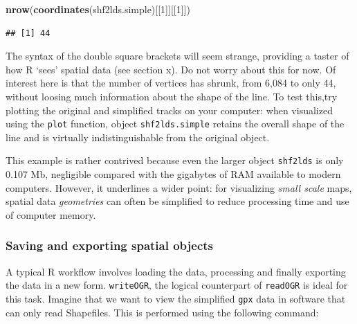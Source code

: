 \documentclass[]{article}
\newenvironment{Shaded}{}{}
\newcommand{\KeywordTok}[1]{\textcolor[rgb]{0.00,0.44,0.13}{\textbf{{#1}}}}
\newcommand{\DecValTok}[1]{\textcolor[rgb]{0.25,0.63,0.44}{{#1}}}
\newcommand{\NormalTok}[1]{{#1}}
\begin{document}
\begin{Shaded}
\begin{Highlighting}[]
\KeywordTok{nrow}\NormalTok{(}\KeywordTok{coordinates}\NormalTok{(shf2lds.simple)[[}\DecValTok{1}\NormalTok{]][[}\DecValTok{1}\NormalTok{]])}
\end{Highlighting}
\end{Shaded}
\begin{verbatim}
## [1] 44
\end{verbatim}
The syntax of the double square brackets will seem strange, providing a
taster of how R `sees' spatial data (see section x). Do not worry about
this for now. Of interest here is that the number of vertices has
shrunk, from 6,084 to only 44, without loosing much information about
the shape of the line. To test this,try plotting the original and
simplified tracks on your computer: when visualized using the
\texttt{plot} function, object \texttt{shf2lds.simple} retains the
overall shape of the line and is virtually indistinguishable from the
original object.

This example is rather contrived because even the larger object
\texttt{shf2lds} is only 0.107 Mb, negligible compared with the
gigabytes of RAM available to modern computers. However, it underlines a
wider point: for visualizing \emph{small scale} maps, spatial data
\emph{geometries} can often be simplified to reduce processing time and
use of computer memory.

\subsubsection{Saving and exporting spatial objects}

A typical R workflow involves loading the data, processing and finally
exporting the data in a new form. \texttt{writeOGR}, the logical
counterpart of \texttt{readOGR} is ideal for this task. Imagine that we
want to view the simplified \texttt{gpx} data in software that can only
read Shapefiles. This is performed using the following command:
\end{document}
